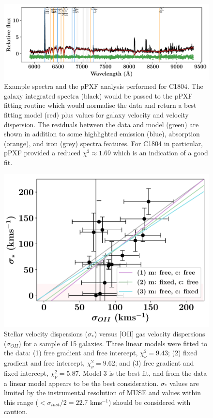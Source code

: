 \documentclass[12pt, twocolumn]{revtex4-1}    %
\begin{document}
\begin{figure}
\includegraphics[width=\textwidth]{data/cube_1804_spectra_complete}
\caption{Example spectra and the pPXF analysis performed for C1804. The galaxy integrated spectra (black) would be passed to the pPXF fitting routine which would normalise the data and return a best fitting model (red) plus values for galaxy velocity and velocity dispersion. The residuals between the data and model (green) are shown in addition to some highlighted emission (blue), absorption (orange), and iron (grey) spectra features. For C1804 in particular, pPXF provided a reduced $\chi^2 \approx 1.69$ which is an indication of a good fit.}
\label{fig:ppxf_spectra}
\end{figure}

\begin{figure}
\includegraphics[width=1.0\linewidth]{data/sigma_star_vs_sigma_oii}
\caption{Stellar velocity dispersions ($\sigma_*$) versus [OII] gas velocity dispersions ($\sigma_{OII}$) for a sample of 15 galaxies. Three linear models were fitted to the data: (1) free gradient and free intercept, $\chi^2_{\nu}=9.43$; (2) fixed gradient and free intercept, $\chi^2_\nu=9.62$; and (3) free gradient and fixed intercept, $\chi^2_\nu=5.87$. Model 3 is the best fit, and from the data a linear model appears to be the best consideration. $\sigma_*$ values are limited by the instrumental resolution of MUSE and values within this range ($<\sigma_{inst}/2=22.7$ kms$^{-1}$) should be considered with caution.  }
\label{fig:velocity_dispersions}
\end{figure}
\end{document}
